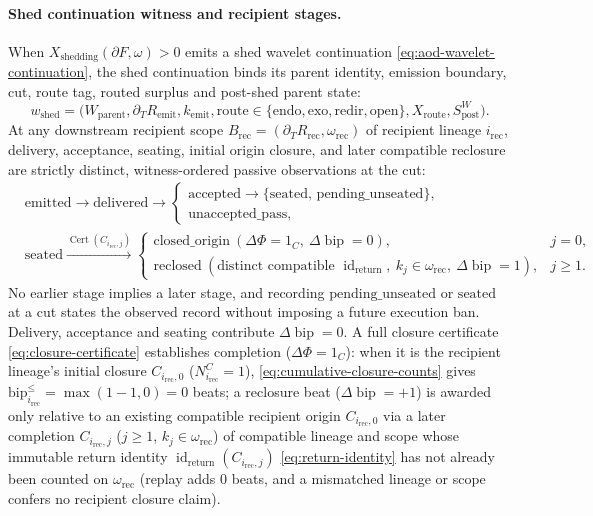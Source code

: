 \paragraph{Shed continuation witness and recipient stages.}
When \(X_{\mathrm{shedding}}(\partial F,\omega)>0\) emits a shed wavelet continuation
\eqref{eq:aod-wavelet-continuation}, the shed continuation binds its parent identity,
emission boundary, cut, route tag, routed surplus and post-shed parent state:
\begin{equation}
w_{\mathrm{shed}}
=
\bigl(W_{\mathrm{parent}},\partial_T R_{\mathrm{emit}},k_{\mathrm{emit}},
\mathrm{route}\in\{\mathrm{endo},\mathrm{exo},\mathrm{redir},\mathrm{open}\},
X_{\mathrm{route}},S^W_{\mathrm{post}}\bigr).
\label{eq:shed-continuation-witness}
\end{equation}
At any downstream recipient scope \(B_{\mathrm{rec}}=(\partial_T R_{\mathrm{rec}},\omega_{\mathrm{rec}})\) of recipient lineage \(i_{\mathrm{rec}}\), delivery, acceptance, seating, initial origin closure, and later compatible reclosure are strictly distinct, witness-ordered passive observations at the cut:
\begin{equation}
\begin{split}
&\mathrm{emitted}\longrightarrow\mathrm{delivered}\longrightarrow
\begin{cases}
\mathrm{accepted}\longrightarrow\{\mathrm{seated},\,\mathrm{pending\_unseated}\},\\
\mathrm{unaccepted\_pass},
\end{cases}\\
&\mathrm{seated}\xrightarrow{\operatorname{Cert}(C_{i_{\mathrm{rec}},j})}
\begin{cases}
\mathrm{closed\_origin}\ (\Delta\Phi=1_C,\ \Delta\operatorname{bip}=0), & j=0,\\
\mathrm{reclosed}\ (\text{distinct compatible }\operatorname{id}_{\mathrm{return}},\ k_j\in\omega_{\mathrm{rec}},\ \Delta\operatorname{bip}=1), & j\ge 1.
\end{cases}
\end{split}
\label{eq:recipient-event-lattice}
\end{equation}
No earlier stage implies a later stage, and recording \(\mathrm{pending\_unseated}\) or \(\mathrm{seated}\) at a cut states the observed record without imposing a future execution ban. Delivery, acceptance and seating contribute \(\Delta\operatorname{bip}=0\). A full closure certificate \eqref{eq:closure-certificate} establishes completion (\(\Delta\Phi=1_C\)): when it is the recipient lineage's initial closure \(C_{i_{\mathrm{rec}},0}\) (\(N^C_{i_{\mathrm{rec}}}=1\)), \eqref{eq:cumulative-closure-counts} gives \(\mathrm{bip}^{\le}_{i_{\mathrm{rec}}}=\max(1-1,0)=0\) beats; a reclosure beat (\(\Delta\operatorname{bip}=+1\)) is awarded only relative to an existing compatible recipient origin \(C_{i_{\mathrm{rec}},0}\) via a later completion \(C_{i_{\mathrm{rec}},j}\) (\(j\ge 1\), \(k_j\in\omega_{\mathrm{rec}}\)) of compatible lineage and scope whose immutable return identity \(\operatorname{id}_{\mathrm{return}}(C_{i_{\mathrm{rec}},j})\) \eqref{eq:return-identity} has not already been counted on \(\omega_{\mathrm{rec}}\) (replay adds \(0\) beats, and a mismatched lineage or scope confers no recipient closure claim).



